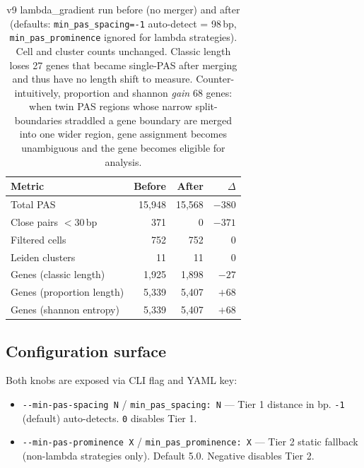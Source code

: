 \documentclass[11pt,a4paper]{article}
\begin{document}
\begin{table}[htbp]
  \centering
  \begin{tabular}{lrrr}
    \toprule
    Metric & Before & After & $\Delta$ \\
    \midrule
    Total PAS                & 15{,}948 & 15{,}568 & $-380$ \\
    Close pairs $<\!30$\,bp  & 371      & 0        & $-371$ \\
    Filtered cells           & 752      & 752      & 0      \\
    Leiden clusters          & 11       & 11       & 0      \\
    Genes (classic length)   & 1{,}925  & 1{,}898  & $-27$  \\
    Genes (proportion length)& 5{,}339  & 5{,}407  & $+68$  \\
    Genes (shannon entropy)  & 5{,}339  & 5{,}407  & $+68$  \\
    \bottomrule
  \end{tabular}
  \caption{v9 lambda\_gradient run before (no merger) and after (defaults:
    \texttt{min\_pas\_spacing=-1} auto-detect = 98\,bp,
    \texttt{min\_pas\_prominence} ignored for lambda strategies).  Cell and
    cluster counts unchanged.  Classic length loses 27 genes that became
    single-PAS after merging and thus have no length shift to measure.
    Counter-intuitively, proportion and shannon \emph{gain} 68 genes: when
    twin PAS regions whose narrow split-boundaries straddled a gene boundary
    are merged into one wider region, gene assignment becomes unambiguous
    and the gene becomes eligible for analysis.}
  \label{tab:merger-effect}
\end{table}

\subsection{Configuration surface}

Both knobs are exposed via CLI flag and YAML key:

\begin{itemize}
  \item \texttt{-{}-min-pas-spacing N} / \texttt{min\_pas\_spacing: N} ---
        Tier 1 distance in bp.  \texttt{-1} (default) auto-detects.
        \texttt{0} disables Tier 1.
  \item \texttt{-{}-min-pas-prominence X} / \texttt{min\_pas\_prominence: X}
        --- Tier 2 static fallback (non-lambda strategies only).  Default
        5.0.  Negative disables Tier 2.
\end{itemize}
\end{document}
